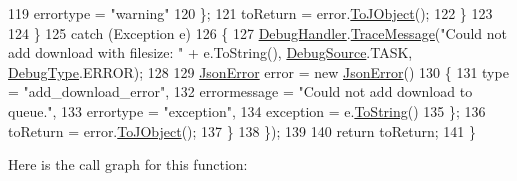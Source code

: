\begin{DoxyCode}
119                             errortype = \textcolor{stringliteral}{"warning"}
120                         \};
121                         toReturn = error.\mbox{\hyperlink{class_little_weeb_library_1_1_models_1_1_json_error_a0623b835bb68d5d5e1f591df6a09dd81}{ToJObject}}();
122                     \}
123 
124                 \}
125                 \textcolor{keywordflow}{catch} (Exception e)
126                 \{
127                     \mbox{\hyperlink{class_little_weeb_library_1_1_handlers_1_1_download_handler_a9f1aedadbd6f343d8de1c54724eca11e}{DebugHandler}}.\mbox{\hyperlink{interface_little_weeb_library_1_1_handlers_1_1_i_debug_handler_a2e405bc3492e683cd3702fae125221bc}{TraceMessage}}(\textcolor{stringliteral}{"Could not add download with
       filesize: "} + e.ToString(), \mbox{\hyperlink{namespace_little_weeb_library_1_1_handlers_a2a6ca0775121c9c503d58aa254d292be}{DebugSource}}.TASK, \mbox{\hyperlink{namespace_little_weeb_library_1_1_handlers_ab66019ed40462876ec4e61bb3ccb0a62}{DebugType}}.ERROR);
128 
129                     \mbox{\hyperlink{class_little_weeb_library_1_1_models_1_1_json_error}{JsonError}} error = \textcolor{keyword}{new} \mbox{\hyperlink{class_little_weeb_library_1_1_models_1_1_json_error}{JsonError}}()
130                     \{
131                         type = \textcolor{stringliteral}{"add\_download\_error"},
132                         errormessage = \textcolor{stringliteral}{"Could not add download to queue."},
133                         errortype = \textcolor{stringliteral}{"exception"},
134                         exception = e.\mbox{\hyperlink{class_little_weeb_library_1_1_models_1_1_json_error_ad7d5522c90119111d2e929f39e7f6d3c}{ToString}}()
135                     \};
136                     toReturn = error.\mbox{\hyperlink{class_little_weeb_library_1_1_models_1_1_json_error_a0623b835bb68d5d5e1f591df6a09dd81}{ToJObject}}();
137                 \}
138             \});
139 
140             \textcolor{keywordflow}{return} toReturn;
141         \}
\end{DoxyCode}
Here is the call graph for this function\+:\nopagebreak

